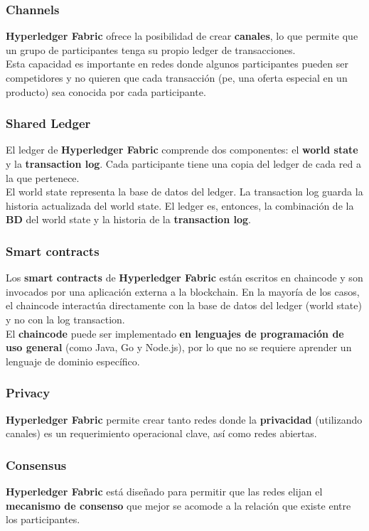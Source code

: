\documentclass{beamer}
\begin{document}
	\begin{frame}
		\frametitle{Channels}
		\textbf{Hyperledger Fabric} ofrece la posibilidad de crear \textbf{canales}, lo que permite que un grupo de participantes tenga su propio ledger de transacciones.\\
		\vspace{4mm}
		Esta capacidad es importante en redes donde algunos participantes pueden ser competidores y no quieren que cada transacción (pe, una oferta especial en un producto) sea conocida por cada participante.
	\end{frame}

	\begin{frame}
		\frametitle{Shared Ledger}
		El ledger de \textbf{Hyperledger Fabric} comprende dos componentes: el \textbf{world state} y la \textbf{transaction log}. Cada participante tiene una copia del ledger de cada red a la que pertenece.\\
		\vspace{4mm}
		El world state representa la base de datos del ledger. La transaction log guarda la historia actualizada del world state. El ledger es, entonces, la combinación de la \textbf{BD} del world state y la historia de la \textbf{transaction log}.
	\end{frame}
	
	\begin{frame}
		\frametitle{Smart contracts}
		Los \textbf{smart contracts} de \textbf{Hyperledger Fabric} están escritos en chaincode y son invocados por una aplicación externa a la blockchain. En la mayoría de los casos, el chaincode interactúa directamente con la base de datos del ledger (world state) y no con la log transaction.\\
		\vspace{4mm}
		El \textbf{chaincode} puede ser implementado \textbf{en lenguajes de programación de uso general} (como Java, Go y Node.js), por lo que no se requiere aprender un lenguaje de dominio específico.\\
	\end{frame}

	\begin{frame}
		\frametitle{Privacy}
		\textbf{Hyperledger Fabric} permite crear tanto redes donde la \textbf{privacidad} (utilizando canales) es un requerimiento operacional clave, así como redes abiertas.
	\end{frame}
	
	\begin{frame}
		\frametitle{Consensus}
		\textbf{Hyperledger Fabric} está diseñado para permitir que las redes elijan el \textbf{mecanismo de consenso} que mejor se acomode a la relación que existe entre los participantes.
	\end{frame}
		
\end{document}
